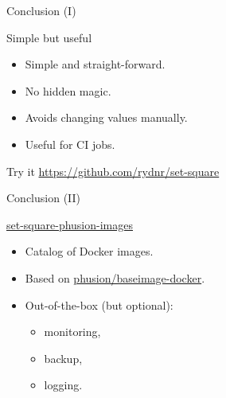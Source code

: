 \documentclass{beamer}
\begin{document}
\begin{frame}{Conclusion (I)}
  \begin{exampleblock}{Simple but useful}
    \begin{itemize}
      \item Simple and straight-forward.
      \item No hidden magic.
      \item Avoids changing values manually.
      \item Useful for CI jobs.
    \end{itemize}
  \end{exampleblock}

  \pause

  \begin{alertblock}{Try it}
    \href{https://github.com/rydnr/set-square}{https://github.com/rydnr/set-square}
  \end{alertblock}

\end{frame}

\begin{frame}{Conclusion (II)}
  \begin{exampleblock}{\href{https://github.com/rydnr/set-square-phusion-images}{set-square-phusion-images}}
    \begin{itemize}
      \item Catalog of Docker images.
      \item Based on \href{https://github.com/phusion/baseimage-docker}{phusion/baseimage-docker}.
      \item Out-of-the-box (but optional):
        \begin{itemize}
          \item monitoring,
          \item backup,
          \item logging.
        \end{itemize}
    \end{itemize}
  \end{exampleblock}

\end{frame}
\end{document}
